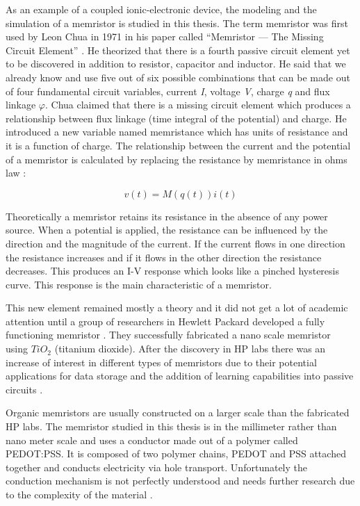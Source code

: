 \begin{doublespace}
As an example of a coupled ionic-electronic device, the modeling and the simulation of a memristor is studied in this thesis. The term memristor was first used by Leon Chua in 1971 in his paper called ``Memristor — The Missing Circuit Element'' \cite{chua}. He theorized that there is a fourth passive circuit element yet to be discovered in addition to resistor, capacitor and inductor. He said that we already know and use five out of six possible combinations that can be made out of four fundamental circuit variables, current \textit{I}, voltage \textit{V}, charge \textit{q} and flux linkage \textit{$\varphi$}. Chua claimed that there is a missing circuit element which produces a relationship between flux linkage (time integral of the potential) and charge. He introduced a new variable named memristance which has units of resistance and it is a function of charge. The relationship between the current and the potential of a memristor is calculated by replacing the resistance by memristance in ohms law \cite{memristance}:


\begin{equation}
v(t)=M(q(t))i(t)
\end{equation}

Theoretically a memristor retains its resistance in the absence of any power source. When a potential is applied, the resistance can be influenced by the direction and the magnitude of the current. If the current flows in one direction the resistance increases and if it flows in the other direction the resistance decreases. This produces an I-V response which looks like a pinched hysteresis curve. This response is the main characteristic of a memristor. 

This new element remained mostly a theory and it did not get a lot of academic attention until a group of researchers in Hewlett Packard developed a fully functioning memristor \cite{MisMem}. They successfully fabricated a nano scale memristor using $TiO_2$ (titanium dioxide). After the discovery in HP labs there was an increase of interest in different types of memristors due to their potential applications for data storage and the addition of learning capabilities into passive circuits \cite{AdaptiveMem} \cite{Synapse} \cite{CMOS}. 

Organic memristors are usually constructed on a larger scale than the  fabricated  HP labs. The memristor studied in this thesis is in the millimeter rather than nano meter scale and uses a conductor made out of a polymer called PEDOT:PSS. It is composed of two polymer chains, PEDOT and PSS attached together and conducts electricity via hole transport. Unfortunately the conduction mechanism is not perfectly understood and needs further research due to the complexity of the material \cite{PedotBook}.


\end{doublespace}
